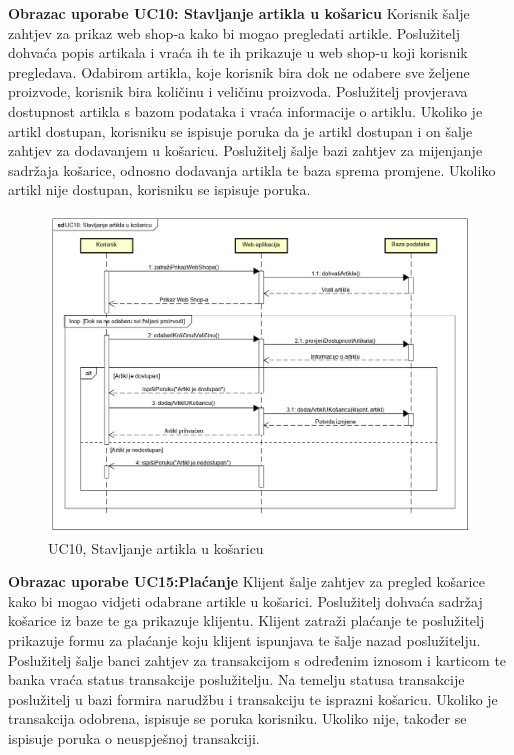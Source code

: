 				\textbf {Obrazac uporabe UC10: Stavljanje artikla u košaricu }
				\bigbreak
				\textnormal {Korisnik šalje zahtjev za prikaz web shop-a kako bi mogao pregledati artikle. Poslužitelj dohvaća popis artikala i vraća ih te ih prikazuje u web shop-u koji korisnik pregledava. Odabirom artikla, koje korisnik bira dok ne odabere sve željene proizvode, korisnik bira količinu i veličinu proizvoda. Poslužitelj provjerava dostupnost artikla s bazom podataka i vraća informacije o artiklu. Ukoliko je artikl dostupan, korisniku se ispisuje poruka da je artikl dostupan i on šalje zahtjev za dodavanjem u košaricu. Poslužitelj šalje bazi zahtjev za mijenjanje sadržaja košarice, odnosno dodavanja artikla te baza sprema promjene. Ukoliko artikl nije dostupan, korisniku se ispisuje poruka.}
				\begin{figure}[H]
					\includegraphics[width=\linewidth]{dijagrami/UC10.png}
					\centering
					\caption{UC10, Stavljanje artikla u košaricu}
					\label{fig:SequanceDiagram1}
				\end{figure}
			\pagebreak
			\textbf {Obrazac uporabe UC15:Plaćanje}
			\bigbreak
			\textnormal {Klijent šalje zahtjev za pregled košarice kako bi mogao vidjeti odabrane artikle u košarici. Poslužitelj dohvaća sadržaj košarice iz baze te ga prikazuje klijentu. Klijent zatraži plaćanje te poslužitelj prikazuje formu za plaćanje koju klijent ispunjava te šalje nazad poslužitelju. Poslužitelj šalje banci zahtjev za transakcijom s određenim iznosom i karticom te banka vraća status transakcije poslužitelju. Na temelju statusa transakcije poslužitelj u bazi formira narudžbu i transakciju te isprazni košaricu. Ukoliko je transakcija odobrena, ispisuje se poruka korisniku. Ukoliko nije, također se ispisuje poruka o neuspješnoj transakciji.}
